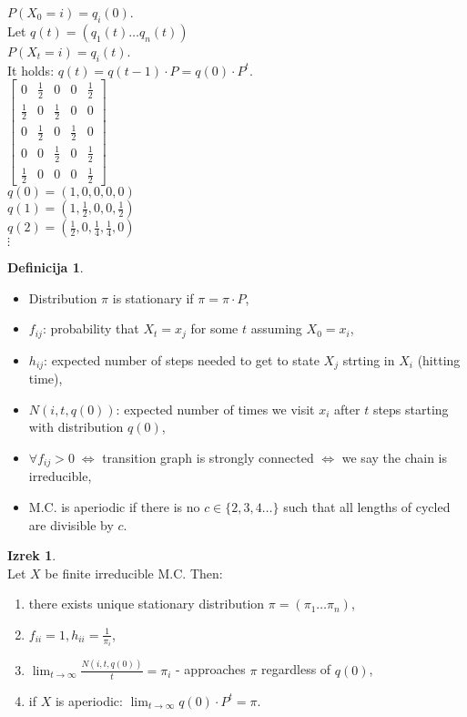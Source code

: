 \documentclass[a4paper, 12pt]{book}
\theoremstyle{definition}
\newtheorem{defn}[counter]{Definicija}
\newtheorem{theorem}[counter]{Izrek}
\theoremstyle{remark}
\begin{document}
$P(X_0 = i) = q_i(0)$. \\
Let $q(t) = (q_1(t) \dots q_n(t))$ \\
$P(X_t = i) = q_i(t)$. \\
It holds: $q(t) = q(t-1) \cdot P = q(0) \cdot P^t$. \\
$\begin{bmatrix}
  0 & \frac{1}{2} & 0 & 0 & \frac{1}{2} \\
  \frac{1}{2} & 0 & \frac{1}{2} & 0 & 0 \\
  0 & \frac{1}{2} & 0 & \frac{1}{2} & 0 \\
  0 & 0 & \frac{1}{2} & 0 & \frac{1}{2} \\
  \frac{1}{2} & 0 & 0 & 0 & \frac{1}{2}
\end{bmatrix}$ \\
$q(0) = (1, 0, 0, 0, 0)$ \\
$q(1) = (1, \frac{1}{2}, 0, 0, \frac{1}{2})$ \\
$q(2) = (\frac{1}{2}, 0, \frac{1}{4}, \frac{1}{4}, 0)$ \\
$\vdots$ \\
\begin{defn} \text{} \\
  \begin{itemize}
    \item Distribution $\pi$ is stationary if $\pi = \pi \cdot P$,
    \item $f_{ij}$: probability that $X_t = x_j$ for some $t$ assuming $X_0 = x_i$,
    \item $h_{ij}$: expected number of steps needed to get to state $X_j$ strting in $X_i$ (hitting time),
    \item $N(i, t, q(0))$: expected number of times we visit $x_i$ after $t$ steps starting with distribution $q(0)$,
    \item $\forall f_{ij} > 0 \; \iff$ transition graph is strongly connected $\iff$ we say the chain is irreducible,
    \item M.C. is aperiodic if there is no $c \in \{2, 3, 4 \dots\}$ such that all lengths of cycled are divisible by $c$.
  \end{itemize}
\end{defn}
\begin{theorem} \text{} \\
  Let $X$ be finite irreducible M.C. Then:
  \begin{enumerate}[label=\alph*)]
    \item there exists unique stationary distribution $\pi = (\pi_1 \dots \pi_n)$,
    \item $f_{ii} = 1, h_{ii} = \frac{1}{\pi_i}$,
    \item $\lim_{t \to \infty} \frac{N(i, t, q(0))}{t} = \pi_i$ - approaches $\pi$ regardless of $q(0)$,
    \item if $X$ is aperiodic: $\lim_{t \to \infty} q(0) \cdot P^t = \pi$. 
  \end{enumerate}
\end{theorem}
\end{document}
